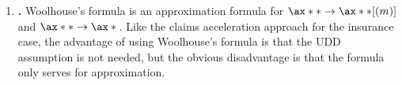 \begin{enumerate}
\begin{itemize}
\begin{itemize}
\item \(\displaystyle \alpha(m)\to \alpha(\infty)=\frac{id}{\mgc{\delta^2}}\).
\item \(\displaystyle \beta(m)\to \beta(\infty)=\frac{i-\mgc{\delta}}{\mgc{\delta^2}}\).
\end{itemize}
\end{itemize}
\begin{note}
Values of \(\alpha(m)\) and \(\beta(m)\) at \(i=0.05\) for some \(m\)
(including \(m=\infty\)) can be found in the SOA FAM-L table.
\end{note}
\item \label{it:woolhouse} \textbf{.} Woolhouse's
formula is an approximation formula for \(\ax**{}\to\ax**{}[(m)]\) and
\(\ax**{}\to\ax*{}\).  Like the claims acceleration approach for the insurance
case, the advantage  of using Woolhouse's formula is
that the UDD assumption is not needed, but the obvious disadvantage
 is that the formula only serves for
approximation.


\end{enumerate}
